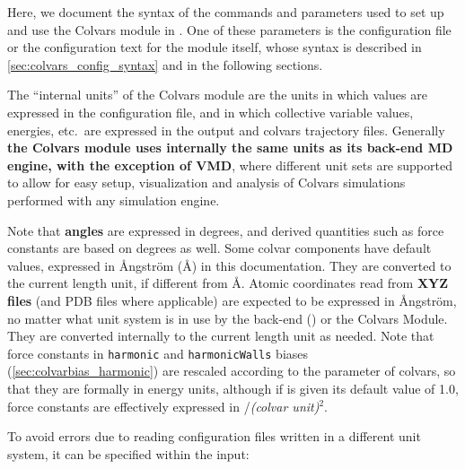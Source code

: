 
Here, we document the syntax of the commands and parameters used to set up and use the Colvars module in \MDENGINE{}.
One of these parameters is the configuration file or the configuration text for the module itself, whose syntax is described in \ref{sec:colvars_config_syntax} and in the following sections.


The ``internal units'' of the Colvars module are the units in which values are expressed in the configuration file, and in which collective variable values, energies, etc.\ are expressed in the output and colvars trajectory files.
Generally \textbf{the Colvars module uses internally the same units as its back-end MD engine, with the exception of VMD}, where different unit sets are supported to allow for easy setup, visualization and analysis of Colvars simulations performed with any simulation engine.

Note that \textbf{angles} are expressed in degrees, and derived quantities such as force constants are based on degrees as well.
Some colvar components have default values, expressed in \AA{}ngstr\"om (\AA) in this documentation. They are converted to the current length unit, if different from \AA.
Atomic coordinates read from \textbf{XYZ files} (and PDB files where applicable) are expected to be expressed in \AA{}ngstr\"om, no matter what unit system is in use by the back-end (\MDENGINE) or the Colvars Module. They are converted internally to the current length unit as needed.
Note that force constants in \texttt{harmonic} and \texttt{harmonicWalls} biases (\ref{sec:colvarbias_harmonic}) are rescaled according to the  parameter of colvars, so that they are formally in energy units, although if  is given its default value of 1.0, force constants are effectively expressed in \energyunit/\textit{(colvar unit)}$^2$.

To avoid errors due to reading configuration files written in a different unit system, it can be specified within the input:


